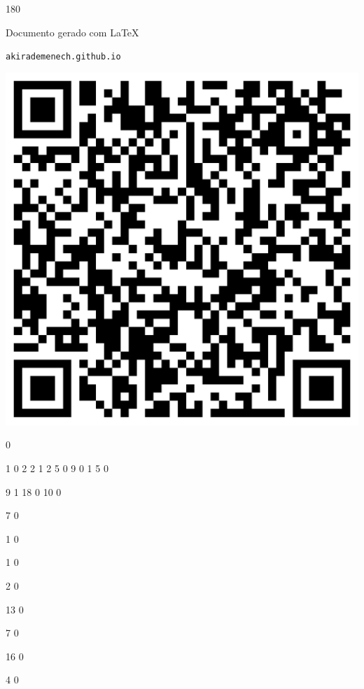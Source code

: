 \documentclass[12pt]{article}
\begin{document}
	\begin{turn}{180}	
		\begin{minipage}{\textwidth}		  
		  Documento gerado com \LaTeX			
		  
		  \texttt{akirademenech.github.io}

		  \includegraphics[height=0.3\textheight]{2e-2.pdf}

		\end{minipage}	
	\end{turn}  
		  
		\vfill  
		  
{
	0	%

	1	%
	0	%
	2	%
	2	%
	1	%
	2	%
	5	%
	0	%
	9	%
	0	%
	1	%
	5	%
	0	%

	9	%
	1	%
	18	%
	0	%
	10	%
	0	%

	7	%
	0	%

	1	%
	0	%

	1	%
	0	%

	2	%
	0	%

	13	%
	0	%

	7	%
	0	%

	16	%
	0	%

	4	%
	0	%

}	  
		    	
\end{document}
